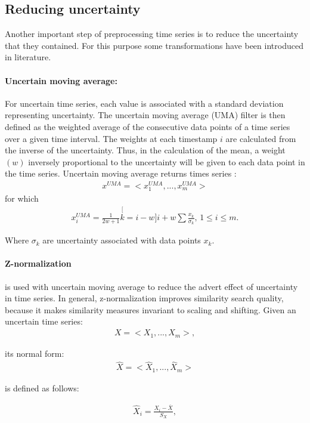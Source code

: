\subsection{Reducing uncertainty}
Another important step of preprocessing time series is to reduce the uncertainty that they contained. For this purpose some transformations have been introduced in literature.


\paragraph{Uncertain moving average:}   For uncertain time series, each value is associated with a standard deviation representing uncertainty. The uncertain moving average (UMA) filter is then defined as the weighted average of the consecutive data points of a time series over a given time interval. The weights at each timestamp $i$ are calculated from the inverse of the uncertainty. Thus, in the calculation of the mean, a weight $(w)$ inversely proportional to the uncertainty will be given to each data point in the time series. Uncertain moving average returns times series \cite{Orang2015}: 
\begin{eqnarray}
x^{UMA}=<x_{1}^{UMA},...,x_{m}^{UMA}>
\end{eqnarray}
for which
\begin{eqnarray}
x_{i}^{UMA}=\frac{1}{2w+1}\stackrel[k=i-w]{i+w}{\sum}\frac{x_{k}}{\sigma_{k}},\,1\leq i\leq m.
\end{eqnarray}

Where $\sigma_{k}$ are uncertainty associated with data points $x_{k}$.

\paragraph{Z-normalization} is used with uncertain moving average to reduce the advert effect of uncertainty in time series. In general, z-normalization improves similarity search quality, because it makes similarity measures invariant to scaling and shifting. Given an uncertain time series: 
\begin{eqnarray}
X=<X_{1},...,X_{m}>,
\end{eqnarray}

its normal form: 
\begin{eqnarray}
\hat{X}=<\hat{X}_{1},...,\hat{X}_{m}>
\end{eqnarray}

is defined as follows: 

\begin{eqnarray}
\ensuremath{\hat{X}_{i}}=\frac{X_{i}-\overline{X}}{S_{X}},
\end{eqnarray}

